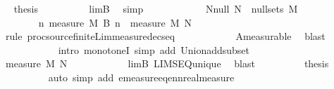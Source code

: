 \begin{isabellebody}
\ \isamarkupfalse%
\ {\isacharquery}{\kern0pt}thesis\isanewline
\ \ \ \ \ \ \ \ \isamarkupfalse%
\ lim{\isacharunderscore}{\kern0pt}B\ \isamarkupfalse%
\ simp\isanewline
\ \ \ \ \isamarkupfalse%
\isanewline
\ \ \ \ \isamarkupfalse%
\ \isamarkupfalse%
\ N{\isacharunderscore}{\kern0pt}null{\isacharcolon}{\kern0pt}\ {\isachardoublequoteopen}{\isacharquery}{\kern0pt}N\ {\isasymin}\ null{\isacharunderscore}{\kern0pt}sets\ {\isacharquery}{\kern0pt}M{\isachardoublequoteclose}\isanewline
\ \ \ \ \isamarkupfalse%
\ {\isacharminus}{\kern0pt}\isanewline
\ \ \ \ \ \ \isamarkupfalse%
\ {\isachardoublequoteopen}{\isacharparenleft}{\kern0pt}{\isasymlambda}n{\isachardot}{\kern0pt}\ measure\ {\isacharquery}{\kern0pt}M\ {\isacharparenleft}{\kern0pt}{\isacharquery}{\kern0pt}B\ n{\isacharparenright}{\kern0pt}{\isacharparenright}{\kern0pt}\ {\isasymlonglonglongrightarrow}\ measure\ {\isacharquery}{\kern0pt}M\ {\isacharquery}{\kern0pt}N{\isachardoublequoteclose}\isanewline
\ \ \ \ \ \ \ \ \isamarkupfalse%
\ {\isacharparenleft}{\kern0pt}rule\ proc{\isacharunderscore}{\kern0pt}source{\isachardot}{\kern0pt}finite{\isacharunderscore}{\kern0pt}Lim{\isacharunderscore}{\kern0pt}measure{\isacharunderscore}{\kern0pt}decseq{\isacharparenright}{\kern0pt}\isanewline
\ \ \ \ \ \ \ \ \ \ \isamarkupfalse%
\ A{\isacharunderscore}{\kern0pt}measurable\ \isamarkupfalse%
\ blast\isanewline
\ \ \ \ \ \ \ \ \ \ \isamarkupfalse%
\ {\isacharparenleft}{\kern0pt}intro\ monotoneI{\isacharcomma}{\kern0pt}\ simp\ add{\isacharcolon}{\kern0pt}\ Union{\isacharunderscore}{\kern0pt}add{\isacharunderscore}{\kern0pt}subset{\isacharparenright}{\kern0pt}\isanewline
\ \ \ \ \ \ \ \ \isamarkupfalse%
\isanewline
\ \ \ \ \ \ \isamarkupfalse%
\ \isamarkupfalse%
\ {\isachardoublequoteopen}measure\ {\isacharquery}{\kern0pt}M\ {\isacharquery}{\kern0pt}N\ {\isacharequal}{\kern0pt}\ {}{\isachardoublequoteclose}\isanewline
\ \ \ \ \ \ \ \ \isamarkupfalse%
\ lim{\isacharunderscore}{\kern0pt}B\ LIMSEQ{\isacharunderscore}{\kern0pt}unique\ \isamarkupfalse%
\ blast\isanewline
\ \ \ \ \ \ \isamarkupfalse%
\ \isamarkupfalse%
\ {\isacharquery}{\kern0pt}thesis\isanewline
\ \ \ \ \ \ \ \ \isamarkupfalse%
\ {\isacharparenleft}{\kern0pt}auto\ simp\ add{\isacharcolon}{\kern0pt}\ emeasure{\isacharunderscore}{\kern0pt}eq{\isacharunderscore}{\kern0pt}ennreal{\isacharunderscore}{\kern0pt}measure{\isacharparenright}{\kern0pt}\isanewline

\end{isabellebody}
